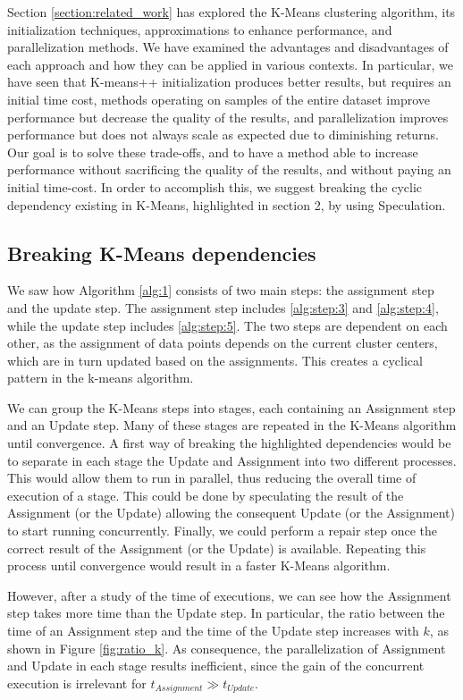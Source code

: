Section \ref{section:related_work} has explored the K-Means clustering algorithm, its initialization techniques, approximations to enhance performance, and parallelization methods. We have examined the advantages and disadvantages of each approach and how they can be applied in various contexts. In particular, we have seen that K-means++ initialization produces better results, but requires an initial time cost, methods operating on samples of the entire dataset improve performance but decrease the quality of the results, and parallelization improves performance but does not always scale as expected due to diminishing returns. Our goal is to solve these trade-offs, and to have a method able to increase performance without sacrificing the quality of the results, and without paying an initial time-cost.  In order to accomplish this, we suggest breaking the cyclic dependency existing in K-Means, highlighted in section 2, by using Speculation. 

\subsection{Breaking K-Means dependencies}

We saw how Algorithm \ref{alg:1} consists of two main steps: the assignment step and the update step. The assignment step includes \ref{alg:step:3} and \ref{alg:step:4}, while the update step includes \ref{alg:step:5}. The two steps are dependent on each other, as the assignment of data points depends on the current cluster centers, which are in turn updated based on the assignments. This creates a cyclical pattern in the k-means algorithm.

We can group the K-Means steps into stages, each containing an Assignment step and
an Update step. Many of these stages are repeated in the K-Means algorithm until convergence.
A first way of breaking the highlighted dependencies would be to separate in each stage the Update and Assignment into two different processes. This would allow them to run in parallel, thus reducing the overall time of execution of a stage. This could be done by speculating the result of the Assignment (or the Update) allowing the consequent Update (or the Assignment) to start running concurrently. Finally, we could perform a repair step once the correct result of the Assignment (or the Update) is available. Repeating this process until convergence would result in a faster K-Means algorithm.

However, after a study of the time of executions, we can see how the Assignment step takes more time than the Update step. In particular, the ratio between the time of an Assignment step and the time of the Update step increases with $k$, as shown in Figure \ref{fig:ratio_k}. As consequence, the parallelization of Assignment and Update in each stage results inefficient, since the gain of the concurrent execution is irrelevant for $t_{Assignment} \gg t_{Update}$.

